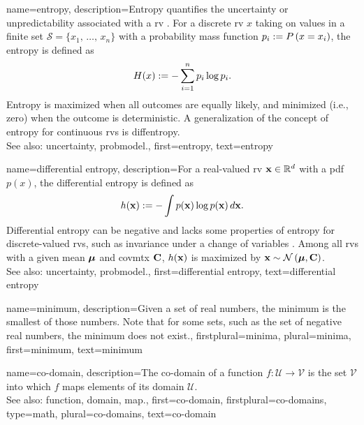 {name={entropy},
	description={Entropy quantifies the \gls{uncertainty} or unpredictability associated with a \gls{rv} \cite{coverthomas}. 
		For a discrete \gls{rv} $x$ taking on values in a finite set $\mathcal{S} = \{x_1, \,\ldots, \,x_n\}$ with 
		a \gls{probability} mass \gls{function} $p_i := P\left(x = x_i\right)$, the entropy is defined as
		\[
		H(x) := -\sum_{i=1}^n p_i \log p_i.
		\]
		Entropy is maximized when all outcomes are equally likely, and minimized (i.e., zero) 
		when the outcome is deterministic. A \gls{generalization} of the concept of entropy for continuous 
		\glspl{rv} is \gls{diffentropy}. 
		\\
		See also: \gls{uncertainty}, \gls{probmodel}.},
	first={entropy},
	text={entropy}
}

{name={differential entropy},
	description={For a real-valued \gls{rv} ${\bf x} \in \mathbb{R}^{d}$ 
		with a \gls{pdf} $p(x)$, the differential \gls{entropy} is defined as \cite{coverthomas}
		\[
		h({\bf x}) := - \int p({\bf x}) \log p({\bf x}) \, d{\bf x}.
		\]
		Differential \gls{entropy} can be negative and lacks some properties of \gls{entropy} for 
		discrete-valued \glspl{rv}, such as invariance under a change of variables \cite{coverthomas}. 
		Among all \glspl{rv} with a given \gls{mean} ${\bm \mu}$ and \gls{covmtx} ${\bf C}$, 
		$h({\bf x})$ is maximized by ${\bf x} \sim \mathcal{N}\left({\bm \mu},{\bf C}\right)$. 
		\\
		See also: \gls{uncertainty}, \gls{probmodel}.},
	first={differential entropy},
	text={differential entropy}
}

{name={minimum},
	description={Given a set of real numbers, the minimum is the smallest of those numbers.
		Note that for some sets, such as the set of negative real numbers, the minimum does not exist.},
	firstplural={minima}, 
 	plural={minima},
	first={minimum},
	text={minimum}
}


{name={co-domain}, 
	description={The co-domain of a \gls{function} 
	$f: \mathcal{U} \rightarrow \mathcal{V}$ is the set $\mathcal{V}$ 
		into which $f$ maps elements of its domain $\mathcal{U}$.  
		\\
		See also: \gls{function}, \gls{domain}, \gls{map}.},
	first={co-domain},
	firstplural={co-domains}, 
	type=math, 
	plural={co-domains},
	text={co-domain}
}

